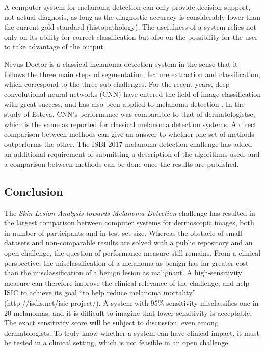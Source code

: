 \documentclass[a4paper,12pt]{article}
\begin{document}

A computer system for melanoma detection can only provide decision support, not actual diagnosis, as long as the diagnostic accuracy is considerably lower than the current gold standard (histopathology). The usefulness of a system relies not only on its ability for correct classification but also on the possibility for the user to take advantage of the output. 

Nevus Doctor is a classical melanoma detection system in the sense that it follows the three main steps of segmentation, feature extraction and classification, which correspond to the three sub challenges.  
For the recent years, deep convolutional neural networks (CNN) have entered the field of image classification with great success, and has also been applied to melanoma detection \cite{Esteva2017Dermatologistlevel}. 
In the study of Esteva, CNN's performance was comparable to that of dermatologistse, which is the same as reported for classical melanoma detection systems.
A direct comparison between methods can give an answer to whether one set of methods outperforms the other. 
The ISBI 2017 melanoma detection challenge has added an additional requirement of submitting a description of the algorithms used, and a comparison between methods can be done once the results are published. 

\subsection{Conclusion}

The {\it Skin Lesion Analysis towards Melanoma Detection} challenge has resulted in the largest comparison between computer systems for dermoscopic images, both in number of participants and in test set size. 
Whereas the obstacle of small datasets and non-comparable results are solved with a public repository and an open challenge, the question of performance measure still remains. 
From a clinical perspective, the misclassification of a melanoma as benign has far greater cost than the misclassification of a benign lesion as malignant. 
A high-sensitivity measure can therefore improve the clinical relevance of the challenge, and help ISIC to achieve its goal ``to help reduce melanoma mortality'' (http://isdis.net/isic-project/). 
A system with $95\%$ sensitivity misclassifies one in 20 melanomas, and it is difficult to imagine that lower sensitivity is acceptable. 
The exact sensitivity score will be subject to discussion, even among dermatologists. 
To truly know whether a system can have clinical impact, it must be tested in a clinical setting, which is not feasible in an open challenge. 
\end{document}

